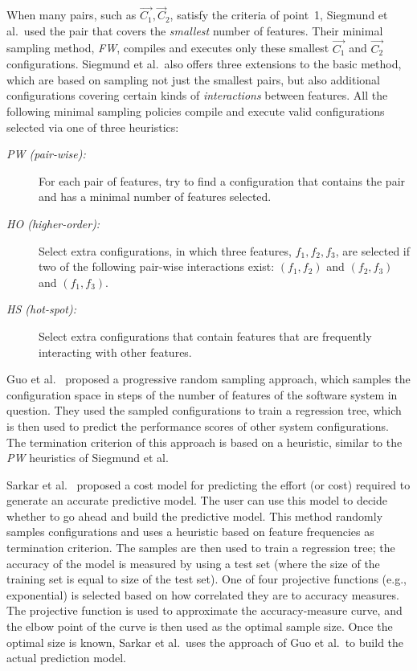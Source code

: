 \documentclass[smallextended]{svjour3}       %
\begin{document}
When many pairs, such as ${\vec{C_1},\vec{C}_2}$, satisfy the criteria of point~1, Siegmund et al.\ used the 
pair that covers the {\em smallest} number of features. Their minimal sampling method, {\em FW},
compiles and executes only these smallest ${\vec{C_1}}$ and ${\vec{C_2}}$ configurations. 
Siegmund et al.\ also offers three extensions to the basic method, which are based on sampling
not just the smallest  pairs, but also additional configurations covering certain kinds of {\em interactions} between features. 
All the following minimal sampling policies compile and   execute valid configurations selected via one of three heuristics:

\begin{description}
\item[{\em PW (pair-wise):}] For each pair of features, try to find a configuration that contains the pair and has a minimal number of features selected. 
\item[{\em HO (higher-order):}] Select extra configurations, in which three features, $f_1,f_2,f_3$, are selected if two of the following pair-wise interactions exist: $(f_1,f_2)$ and $(f_2,f_3)$ and $(f_1,f_3)$.
\item[{\em HS (hot-spot):}] Select extra configurations that contain features that are
frequently interacting with other features. 
\end{description}


Guo et al.~\cite{guo2013variability} proposed a progressive random sampling approach, which samples the configuration space in steps of the number of features of the software system in question. They used the sampled configurations to train a regression tree, which is then used to predict the performance scores of other system configurations. The termination criterion of this approach is based on a heuristic, similar to the {\em PW} heuristics of Siegmund et al. 

Sarkar et al.~\cite{sarkar2015cost} proposed a cost model for predicting the effort (or cost) required to generate an accurate predictive model. The user can use this model to decide whether to go ahead and build the predictive model. This method randomly samples configurations and uses a heuristic based on feature frequencies as termination criterion. The samples are then used to train a regression tree; the accuracy of the model is measured by using a test set (where the size of the training set is equal to size of the test set). One of four projective functions (e.g., exponential) is selected based on how correlated they are to  accuracy measures. The projective function is used to approximate the accuracy-measure curve, and the elbow point of the curve is then used as the optimal sample size. Once the optimal size is known, Sarkar et al.\ uses the approach of Guo et al.\ to build the actual prediction model.  
\end{document}
